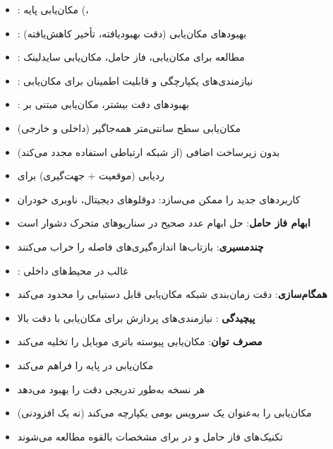 \begin{itemize}
\tightlist
\item
  : مکان‌یابی پایه  (، 
\item
  : بهبودهای مکان‌یابی (دقت بهبودیافته، تأخیر کاهش‌یافته)
\item
  : مطالعه  برای مکان‌یابی، فاز حامل، مکان‌یابی سایدلینک
\item
  : نیازمندی‌های یکپارچگی و قابلیت اطمینان برای مکان‌یابی
\item
  : بهبودهای دقت بیشتر، مکان‌یابی مبتنی بر 
\end{itemize}


\begin{itemize}
\tightlist
\item
  مکان‌یابی سطح سانتی‌متر همه‌جاگیر (داخلی و خارجی)
\item
  بدون زیرساخت اضافی (از شبکه ارتباطی استفاده مجدد می‌کند)
\item
  ردیابی  (موقعیت + جهت‌گیری) برای 
\item
  کاربردهای جدید را ممکن می‌سازد: دوقلوهای دیجیتال، ناوبری خودران
\end{itemize}


\begin{itemize}
\tightlist
\item
  \textbf{ابهام فاز حامل}: حل ابهام عدد صحیح در سناریوهای متحرک دشوار است
\item
  \textbf{چندمسیری}: بازتاب‌ها اندازه‌گیری‌های فاصله را خراب می‌کنند
\item
  : غالب در محیط‌های داخلی
\item
  \textbf{همگام‌سازی}: دقت زمان‌بندی شبکه مکان‌یابی قابل دستیابی را محدود می‌کند
\item
  \textbf{پیچیدگی }: نیازمندی‌های پردازش برای مکان‌یابی با دقت بالا
\item
  \textbf{مصرف توان}: مکان‌یابی پیوسته باتری موبایل را تخلیه می‌کند
\end{itemize}


\begin{itemize}
\tightlist
\item
  مکان‌یابی  در  پایه را فراهم می‌کند
\item
  هر نسخه به‌طور تدریجی دقت را بهبود می‌دهد
\item
   مکان‌یابی را به‌عنوان یک سرویس بومی یکپارچه می‌کند (نه یک افزودنی)
\item
  تکنیک‌های فاز حامل و  در  برای مشخصات بالقوه  مطالعه می‌شوند
\end{itemize}

